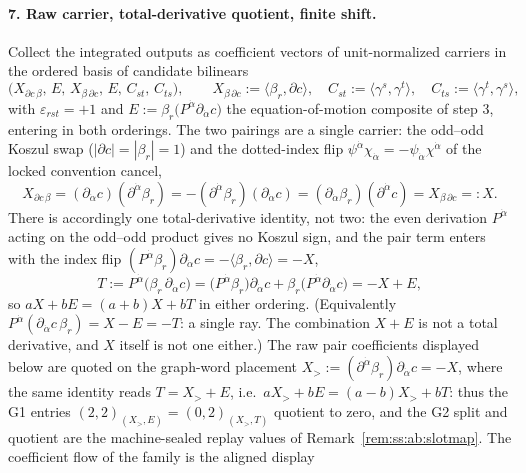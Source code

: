 \paragraph{7. Raw carrier, total-derivative quotient, finite shift.} Collect the integrated outputs as coefficient vectors of unit-normalized carriers in the ordered basis of candidate bilinears
\begin{equation}\label{eq:ss:ab:basis}
\bigl(X_{\partial c\,\beta},\,E,\,X_{\beta\,\partial c},\,E,\,
C_{st},\,C_{ts}\bigr),
\qquad
X_{\beta\,\partial c}:=\langle\beta_r,\partial c\rangle,
\quad
C_{st}:=\langle\gamma^{s},\gamma^{t}\rangle,
\quad
C_{ts}:=\langle\gamma^{t},\gamma^{s}\rangle,
\end{equation}
with $\varepsilon_{rst}=+1$ and $E:=\beta_r\bigl(P^{\dot\alpha}\partial_{\dot\alpha}c\bigr)$ the equation-of-motion composite of step 3, entering in both orderings. The two pairings are a single carrier: the odd--odd Koszul swap ($|\partial c|=|\beta_r|=1$) and the dotted-index flip $\psi^{\dot\alpha}\chi_{\dot\alpha}=-\psi_{\dot\alpha}\chi^{\dot\alpha}$ of the locked convention cancel,
\begin{equation}\label{eq:ss:ab:paireq}
X_{\partial c\,\beta}=(\partial_{\dot\alpha}c)(\partial^{\dot\alpha}\beta_r)
=-(\partial^{\dot\alpha}\beta_r)(\partial_{\dot\alpha}c)
=(\partial_{\dot\alpha}\beta_r)(\partial^{\dot\alpha}c)
=X_{\beta\,\partial c}=:X .
\end{equation}
There is accordingly one total-derivative identity, not two: the even derivation $P^{\dot\alpha}$ acting on the odd--odd product gives no Koszul sign, and the pair term enters with the index flip $(P^{\dot\alpha}\beta_r)\partial_{\dot\alpha}c=-\langle\beta_r,\partial c\rangle=-X$,
\begin{equation}\label{eq:ss:ab:td}
T:=P^{\dot\alpha}\bigl(\beta_r\,\partial_{\dot\alpha}c\bigr)
=\bigl(P^{\dot\alpha}\beta_r\bigr)\partial_{\dot\alpha}c
+\beta_r\bigl(P^{\dot\alpha}\partial_{\dot\alpha}c\bigr)
=-X+E ,
\end{equation}
so $aX+bE=(a+b)X+bT$ in either ordering. (Equivalently $P^{\dot\alpha}(\partial_{\dot\alpha}c\,\beta_r)=X-E=-T$: a single ray. The combination $X+E$ is not a total derivative, and $X$ itself is not one either.) The raw pair coefficients displayed below are quoted on the graph-word placement $X_{>}:=(\partial^{\dot\alpha}\beta_r)\partial_{\dot\alpha}c=-X$, where the same identity reads $T=X_{>}+E$, i.e.\ $aX_{>}+bE=(a-b)X_{>}+bT$: thus the G1 entries $(2,2)_{(X_{>},E)}=(0,2)_{(X_{>},T)}$ quotient to zero, and the G2 split and quotient are the machine-sealed replay values of Remark~\ref{rem:ss:ab:slotmap}. The coefficient flow of the family is the aligned display

